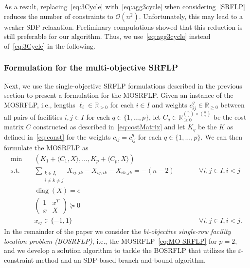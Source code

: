 \documentclass{article}
\newcommand{\dimension}{\binom{n}{2}}
\newcommand{\SRFLP}{SRFLP\xspace}
\newcommand{\MOSRFLP}{MOSRFLP\xspace}
\newcommand{\BOSRFLP}{BOSRFLP\xspace}
\DeclareMathOperator{\diag}{diag}
\begin{document}
As a result, replacing~\eqref{eq:3Cycle} with~\eqref{eq:agg3cycle} when considering~\eqref{SRFLP} reduces the number of constraints to $\mathcal{O}(n^2)$. Unfortunately, this may lead to a weaker SDP relaxation. Preliminary computations showed that this reduction is still preferable for our algorithm. Thus, we 
use~\eqref{eq:agg3cycle} instead of~\eqref{eq:3Cycle} in the following.

\subsubsection{Formulation for the multi-objective \SRFLP}\label{sec:MO-SRFLPForm}

Next, we use the single-objective \SRFLP formulations described in the previous section to present a formulation for the \MOSRFLP. Given an instance of the \MOSRFLP, i.e., lengths $\ell_i \in \mathbb{R}_{>0}$ for each $i \in I$ and weights $c_{ij}^q \in \mathbb{R}_{\geq0}$ between all pairs of facilities $i,j \in I$ for each $q \in \{1, \dots,p\}$, let $C_q \in \mathbb{R}_{\geq0}^{\dimension \times \dimension}$ 
be the cost matrix $C$ constructed as described in~\eqref{eq:costMatrix} and let $K_q$ 
be the $K$ as defined in~\eqref{eq:const} for the weights $c_{ij} = c_{ij}^q$ for each $q \in \{1, \dots,p\}$.
We can then 
formulate the \MOSRFLP as 
\begin{subequations}
\label{eq:MO-SRFLP}
    \begin{align}
        \min        \quad   & (K_1+\langle C_1, X\rangle,\dots,K_p+\langle C_p, X\rangle) \\
        \text{s.t.} \quad  & \sum_{\substack{k \in I, \\ i \neq k \neq j}} X_{ij,jk} - X_{ij,ik} - X_{ik,jk} = -(n-2) &\qquad& \forall i, j \in I, i < j \label{eq:MO-SRFLP-3Cycle}\\
                            & \diag(X) = e \label{eq:MO-SRFLP-diag}\\
                            & \begin{pmatrix}
                                1 & x^T \\
                                x & X
                            \end{pmatrix}\succeq 0 \label{eq:MO-SRFLP-psd}\\
                             & x_{ij} \in \{-1,1\} && \forall i, j \in I, i < j. \label{eq:MO-SRFLP-xint} 
    \end{align} 
\end{subequations}
In the remainder of the paper we consider the \emph{bi-objective single-row facility location problem (\BOSRFLP)}, i.e.,  the \MOSRFLP~\eqref{eq:MO-SRFLP} for $p=2$, 
and we develop a solution algorithm to tackle the \BOSRFLP that utilizes the $\varepsilon$-constraint method and an SDP-based branch-and-bound algorithm.
\end{document}
